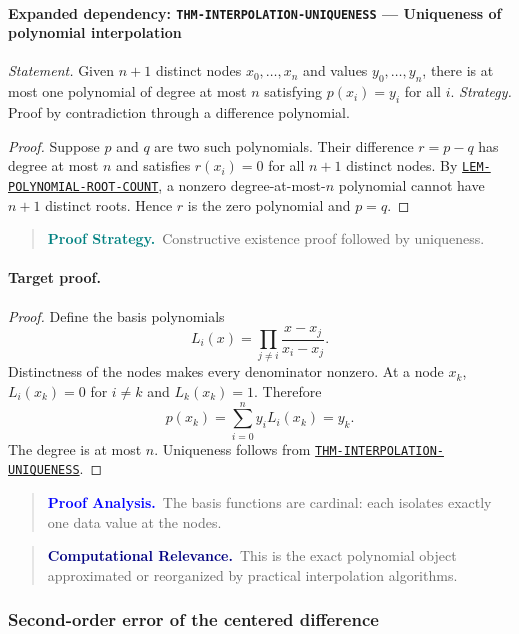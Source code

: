 \documentclass[10pt]{article}
\newcommand{\pidraw}[1]{\begingroup\urlstyle{tt}\nolinkurl{#1}\endgroup}
\newcommand{\pidref}[1]{\hyperref[prf:#1]{\pidraw{#1}}}
\newcommand{\pid}[1]{\pidref{#1}}
\theoremstyle{definition}
\theoremstyle{remark}
\newenvironment{proofstrategy}
{\begin{quote}\small\noindent\textbf{\textcolor{teal}{Proof Strategy.}}\ }
{\end{quote}}
\newenvironment{proofanalysis}
{\begin{quote}\small\noindent\textbf{\textcolor{blue}{Proof Analysis.}}\ }
{\end{quote}}
\newenvironment{computationalrelevance}
{\begin{quote}\small\noindent\textbf{\textcolor{navy}{Computational Relevance.}}\ }
{\end{quote}}
\begin{document}
\paragraph{Expanded dependency: \pidraw{THM-INTERPOLATION-UNIQUENESS} --- Uniqueness of polynomial interpolation}
\textit{Statement.} Given $n+1$ distinct nodes $x_0,\ldots,x_n$ and values $y_0,\ldots,y_n$, there is at most one polynomial of degree at most $n$ satisfying $p(x_i)=y_i$ for all $i$.
\textit{Strategy.} Proof by contradiction through a difference polynomial.
\begin{proof}Suppose $p$ and $q$ are two such polynomials. Their difference
$r=p-q$ has degree at most $n$ and satisfies
$r(x_i)=0$ for all $n+1$ distinct nodes. By
\pid{LEM-POLYNOMIAL-ROOT-COUNT}, a nonzero degree-at-most-$n$ polynomial cannot
have $n+1$ distinct roots. Hence $r$ is the zero polynomial and $p=q$.\end{proof}

\begin{proofstrategy}Constructive existence proof followed by uniqueness.\end{proofstrategy}

\paragraph{Target proof.}

\begin{proof}

Define the basis polynomials
\[
L_i(x)=
\prod_{j\ne i}\frac{x-x_j}{x_i-x_j}.
\]
Distinctness of the nodes makes every denominator nonzero. At a node $x_k$,
$L_i(x_k)=0$ for $i\ne k$ and $L_k(x_k)=1$. Therefore
\[
p(x_k)=\sum_{i=0}^n y_i L_i(x_k)=y_k.
\]
The degree is at most $n$. Uniqueness follows from
\pid{THM-INTERPOLATION-UNIQUENESS}.

\end{proof}

\begin{proofanalysis}The basis functions are cardinal: each isolates exactly one data value at the nodes.\end{proofanalysis}

\begin{computationalrelevance}This is the exact polynomial object approximated or reorganized by practical interpolation algorithms.\end{computationalrelevance}

\subsubsection{Second-order error of the centered difference}
\end{document}
